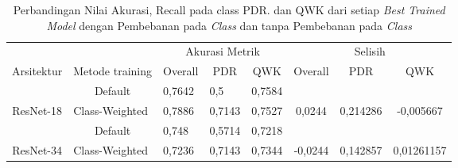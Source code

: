 \begin{table}[hbtp]
	\begin{center}
	\caption{Perbandingan Nilai Akurasi, Recall pada class PDR. dan QWK dari setiap \emph{Best Trained Model} dengan Pembebanan pada \emph{Class} dan tanpa Pembebanan pada \emph{Class}}
	\label{tb:PerbandinganHasilBestTrain}
	\begin{tabular}{|c|c|lll|ccc|}
		\hline
		\cellcolor[HTML]{C0C0C0}                             & \cellcolor[HTML]{C0C0C0}                                  & \multicolumn{3}{c|}{\cellcolor[HTML]{C0C0C0}Akurasi Metrik}                           & \multicolumn{3}{c|}{\cellcolor[HTML]{C0C0C0}Selisih}                                                                            \\ \cline{3-8} 
		\multirow{-2}{*}{\cellcolor[HTML]{C0C0C0}Arsitektur} & \multirow{-2}{*}{\cellcolor[HTML]{C0C0C0}Metode training} & \multicolumn{1}{c|}{Overall} & \multicolumn{1}{c|}{PDR}    & \multicolumn{1}{c|}{QWK} & \multicolumn{1}{c|}{Overall}                   & \multicolumn{1}{c|}{PDR}                        & QWK                          \\ \hline
															 & Default                                                   & \multicolumn{1}{l|}{0,7642}  & \multicolumn{1}{l|}{0,5}    & 0,7584                   & \multicolumn{1}{c|}{}                          & \multicolumn{1}{c|}{}                           &                              \\ \cline{2-5}
		\multirow{-2}{*}{ResNet-18}                          & \multicolumn{1}{l|}{Class-Weighted}                       & \multicolumn{1}{l|}{0,7886}  & \multicolumn{1}{l|}{0,7143} & 0,7527                   & \multicolumn{1}{c|}{\multirow{-2}{*}{0,0244}}  & \multicolumn{1}{c|}{\multirow{-2}{*}{0,214286}} & \multirow{-2}{*}{-0,005667}  \\ \hline
															 & Default                                                   & \multicolumn{1}{l|}{0,748}   & \multicolumn{1}{l|}{0,5714} & 0,7218                   & \multicolumn{1}{c|}{}                          & \multicolumn{1}{c|}{}                           &                              \\ \cline{2-5}
		\multirow{-2}{*}{ResNet-34}                          & \multicolumn{1}{l|}{Class-Weighted}                       & \multicolumn{1}{l|}{0,7236}  & \multicolumn{1}{l|}{0,7143} & 0,7344                   & \multicolumn{1}{c|}{\multirow{-2}{*}{-0,0244}} & \multicolumn{1}{c|}{\multirow{-2}{*}{0,142857}} & \multirow{-2}{*}{0,01261157} \\ \hline

\end{tabular}
\end{center}
\end{table}
